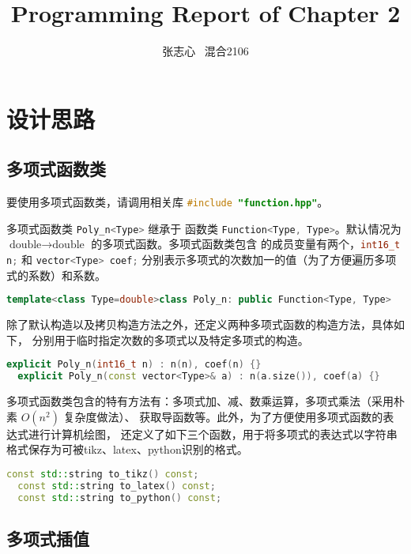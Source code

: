 \documentclass[lang=cn,a4paper,newtx,bibend=bibtex]{elegantpaper}
\title{Programming Report of Chapter 2}
\author{张志心 \ 混合2106}
\date{\zhdate{2023/10/08}}
\begin{document}
\maketitle

\section{设计思路}

\subsection{多项式函数类}

要使用多项式函数类，请调用相关库 \lstinline[language=C++]{#include "function.hpp"}。

多项式函数类 \lstinline[language=C++]{Poly_n<Type>} 继承于
函数类 \lstinline[language=C++]{Function<Type, Type>}。默认情况为 $\text{double}\to\text{double}$ 的多项式函数。多项式函数类包含
的成员变量有两个，\lstinline[language=C++]{int16_t n;} 和 \lstinline[language=C++]{vector<Type> coef;}
 分别表示多项式的次数加一的值（为了方便遍历多项式的系数）和系数。


\begin{lstlisting}[language=C++]
  template<class Type=double>class Poly_n: public Function<Type, Type>
\end{lstlisting}

除了默认构造以及拷贝构造方法之外，还定义两种多项式函数的构造方法，具体如下，
分别用于临时指定次数的多项式以及特定多项式的构造。

\begin{lstlisting}[language=C++]
  explicit Poly_n(int16_t n) : n(n), coef(n) {}
  explicit Poly_n(const vector<Type>& a) : n(a.size()), coef(a) {}
\end{lstlisting}

多项式函数类包含的特有方法有：多项式加、减、数乘运算，多项式乘法（采用朴素 $O(n^2)$ 复杂度做法）、
获取导函数等。此外，为了方便使用多项式函数的表达式进行计算机绘图，
还定义了如下三个函数，用于将多项式的表达式以字符串格式保存为可被tikz、latex、python识别的格式。

\begin{lstlisting}[language=C++]
  const std::string to_tikz() const;
  const std::string to_latex() const;
  const std::string to_python() const;
\end{lstlisting}


\subsection{多项式插值}
\end{document}

